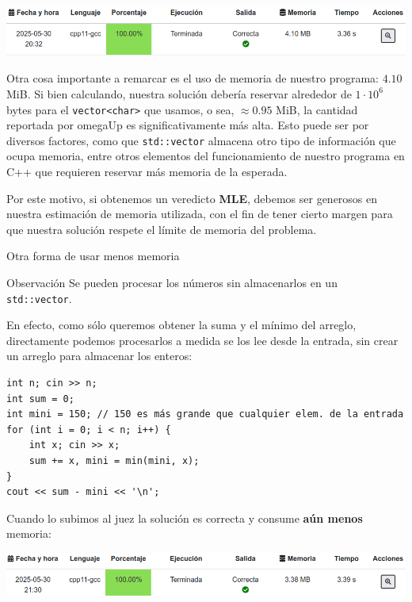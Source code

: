 \documentclass{beamer}
\begin{document}
    \begin{frame}[noframenumbering]
        \begin{center}
            \includegraphics[width=.9\linewidth]{./res/ou_problem_ac_char.png}
        \end{center}

        Otra cosa importante a remarcar es el uso de memoria de nuestro programa: $4.10$ MiB. \pause Si bien calculando, nuestra solución debería reservar alrededor de $1 \cdot 10^6$ bytes para el \texttt{vector<char>} que usamos, o sea, $\approx 0.95$ MiB, la cantidad reportada por omegaUp es significativamente más alta. \pause Esto puede ser por diversos factores, como que \texttt{std::vector} almacena otro tipo de información que ocupa memoria, entre otros elementos del funcionamiento de nuestro programa en C++ que requieren reservar más memoria de la esperada. \pause

        Por este motivo, si obtenemos un veredicto \textbf{MLE}, debemos ser generosos en nuestra estimación de memoria utilizada, con el fin de tener cierto margen para que nuestra solución respete el límite de memoria del problema.
    \end{frame}

    \begin{frame}[fragile]{Otra forma de usar menos memoria}
        \pause
        \begin{block}{Observación}
            Se pueden procesar los números sin almacenarlos en un \texttt{std::vector}.
        \end{block} \pause
        En efecto, como sólo queremos obtener la suma y el mínimo del arreglo, directamente podemos procesarlos a medida se los lee desde la entrada, sin crear un arreglo para almacenar los enteros:\pause

        \begin{verbatim}
int n; cin >> n;
int sum = 0;
int mini = 150; // 150 es más grande que cualquier elem. de la entrada
for (int i = 0; i < n; i++) {
    int x; cin >> x;
    sum += x, mini = min(mini, x);
}
cout << sum - mini << '\n';
        \end{verbatim}
        \pause

        Cuando lo subimos al juez la solución es correcta y consume \textbf{aún menos} memoria: \pause
        \begin{center}
            \includegraphics[width=.8\linewidth]{./res/ou_problem_ac_novec.png}
        \end{center}
    \end{frame}
\end{document}

